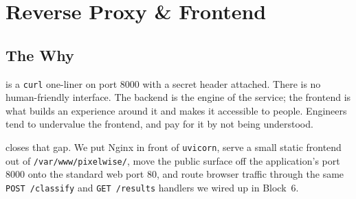 
\chapter{Reverse Proxy \& Frontend}


\section{The Why}

 is a \texttt{curl} one-liner on
port 8000 with a secret header attached.
There is no human-friendly interface.
The backend is the engine of the service; the frontend is what builds an
experience around it and makes it accessible to people.
Engineers tend to undervalue the frontend, and pay for it by not being
understood.

 closes that gap.
We put Nginx in front of \texttt{uvicorn},
serve a small static frontend out of \texttt{/var/www/pixelwise/},
move the public surface off the application's port 8000 onto the standard
web port 80, and route browser traffic through the same
\texttt{POST /classify} and \texttt{GET /results} handlers we wired up in
Block~6.


